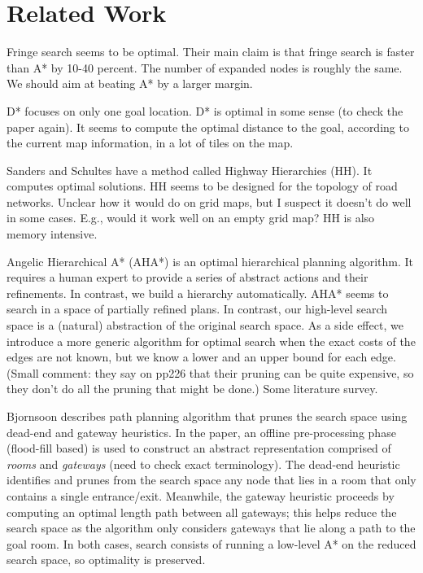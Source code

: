 \section{Related Work}
\label{ia-sec:relatedwork}

Fringe search seems to be optimal. Their main claim is that fringe search is faster than A* by 10-40 percent. The number of expanded nodes is roughly the same. We should aim at beating A* by a larger margin.
\par
D* focuses on only one goal location. D* is optimal in some sense (to check the paper again).
It seems to compute the optimal distance to the goal, according to the current map information,
in a lot of tiles on the map.
\par
Sanders and Schultes have a method called Highway Hierarchies (HH). It computes optimal solutions. 
HH seems to be designed for the topology of road networks. Unclear how it would do on grid maps, but I suspect it doesn't do well in some cases. E.g., would it work well on an empty grid map? HH is also memory intensive.
\par
Angelic Hierarchical A* (AHA*) is an optimal hierarchical planning algorithm.
It requires a human expert to provide a series of abstract actions and their refinements.
In contrast, we build a hierarchy automatically.
AHA* seems to search in a space of partially refined plans. 
In contrast, our high-level search space is a (natural) abstraction of the original search space.
As a side effect, we introduce a more generic algorithm for optimal search when the exact costs of the edges are not known, but we know a lower and an upper bound for each edge.
(Small comment: they say on pp226 that their pruning can be quite expensive, so they don't do all the pruning that might be done.)
Some literature survey.
\par
Bjornsoon describes path planning algorithm that prunes the search space using dead-end and gateway heuristics. 
In the paper, an offline pre-processing phase (flood-fill based) is used to construct an abstract representation comprised of \emph{rooms} and \emph{gateways} (need to check exact terminology). 
The dead-end heuristic identifies and prunes from the search space any node that lies in a room that only contains a single entrance/exit. 
Meanwhile, the gateway heuristic proceeds by computing an optimal length path between all gateways; this helps reduce the search space as the algorithm only considers gateways that lie along a path to the goal room.  
In both cases, search consists of running a low-level A* on the reduced search space, so optimality is preserved.
